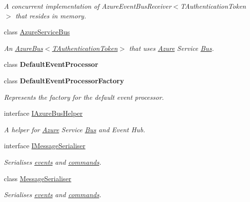 \begin{DoxyCompactItemize}
\begin{DoxyCompactList}\small\item\em A concurrent implementation of Azure\+Event\+Bus\+Receiver$<$\+T\+Authentication\+Token$>$ that resides in memory. \end{DoxyCompactList}\item 
class \hyperlink{classCqrs_1_1Azure_1_1ServiceBus_1_1AzureServiceBus}{Azure\+Service\+Bus}
\begin{DoxyCompactList}\small\item\em An \hyperlink{classCqrs_1_1Azure_1_1ServiceBus_1_1AzureBus_a1046ff74282fd178f43e28420433d2a9_a1046ff74282fd178f43e28420433d2a9}{Azure\+Bus$<$\+T\+Authentication\+Token$>$} that uses \hyperlink{namespaceCqrs_1_1Azure}{Azure} Service \hyperlink{namespaceCqrs_1_1Bus}{Bus}. \end{DoxyCompactList}\item 
class {\bfseries Default\+Event\+Processor}
\item 
class {\bfseries Default\+Event\+Processor\+Factory}
\begin{DoxyCompactList}\small\item\em Represents the factory for the default event processor. \end{DoxyCompactList}\item 
interface \hyperlink{interfaceCqrs_1_1Azure_1_1ServiceBus_1_1IAzureBusHelper}{I\+Azure\+Bus\+Helper}
\begin{DoxyCompactList}\small\item\em A helper for \hyperlink{namespaceCqrs_1_1Azure}{Azure} Service \hyperlink{namespaceCqrs_1_1Bus}{Bus} and Event Hub. \end{DoxyCompactList}\item 
interface \hyperlink{interfaceCqrs_1_1Azure_1_1ServiceBus_1_1IMessageSerialiser}{I\+Message\+Serialiser}
\begin{DoxyCompactList}\small\item\em Serialises \hyperlink{}{events} and \hyperlink{}{commands}. \end{DoxyCompactList}\item 
class \hyperlink{classCqrs_1_1Azure_1_1ServiceBus_1_1MessageSerialiser}{Message\+Serialiser}
\begin{DoxyCompactList}\small\item\em Serialises \hyperlink{}{events} and \hyperlink{}{commands}. \end{DoxyCompactList}\end{DoxyCompactItemize}
